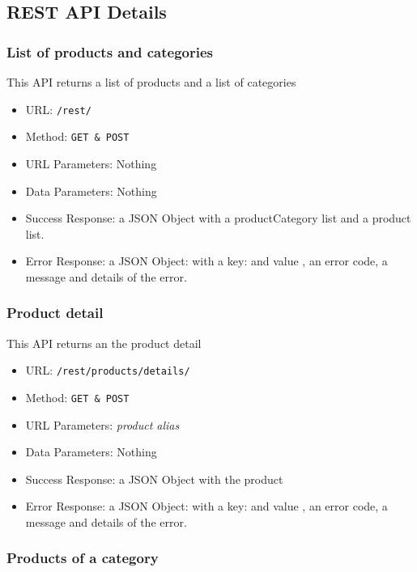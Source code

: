 \subsection{REST API Details}


\subsubsection*{List of products and categories}

This API returns a list of products and a list of categories

\begin{itemize}
    \item URL: \texttt{/rest/}
    \item Method: \texttt{GET \& POST}
    \item URL Parameters: Nothing
    \item Data Parameters: Nothing
    \item Success Response: a JSON Object with a productCategory list and a product list.
    \item Error Response: a JSON Object: with a key:   and value , an error code, a message and details of the error.
    
\end{itemize}

\subsubsection*{Product detail}

This API returns an the product detail

\begin{itemize}
    \item URL: \texttt{/rest/products/details/}
    \item Method: \texttt{GET \& POST}
    \item URL Parameters: \textit{product alias}
    \item Data Parameters: Nothing
    \item Success Response: a JSON Object with the product
    \item Error Response: a JSON Object: with a key:   and value , an error code, a message and details of the error.
\end{itemize}

\subsubsection*{Products of a category}

